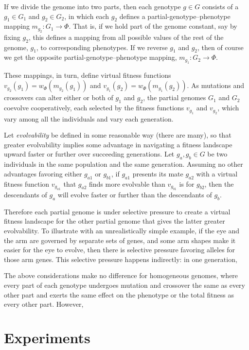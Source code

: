 \documentclass[letterpaper]{article}
\begin{document}
If we divide the genome into two parts, then each genotype $g \in G$ consists
of a $g_1 \in G_1$ and $g_2 \in G_2$, in which each $g_2$ defines a
partial-genotype--phenotype mapping $m_{g_2} : G_1 \rightarrow \Phi$. That is,
if we hold part of the genome constant, say by fixing $g_2$, this defines a
mapping from all possible values of the rest of the genome, $g_1$, to
corresponding phenotypes. If we reverse $g_1$ and $g_2$, then of course we get
the opposite partial-genotype--phenotype mapping, $m_{g_1} : G_2 \rightarrow
\Phi$.

These mappings, in turn, define virtual fitness functions $v_{g_2}(g_1) =
w_\Phi(m_{g_2}(g_1))$ and $v_{g_1}(g_2) = w_\Phi(m_{g_1}(g_2))$. As mutations
and crossovers can alter either or both of $g_1$ and $g_2$, the partial
genomes $G_1$ and $G_2$ coevolve cooperatively, each selected by
the fitness functions $v_{g_1}$ and $v_{g_2}$, which vary among all the
individuals and vary each generation.

Let \textit{evolvability} be defined in some reasonable way (there are many),
so that greater evolvability implies some advantage in navigating a fitness
landscape upward faster or further over succeeding generations. Let $g_a,g_b
\in G$ be two individuals in the same population and the same generation.
Assuming no other advantages favoring either $g_{a1}$ or $g_{b1}$, if $g_{a1}$
presents its mate $g_{a2}$ with a virtual fitness function $v_{g_{a1}}$ that
$g_{a2}$ finds more evolvable than $v_{g_{b1}}$ is for $g_{b2}$, then the
descendants of $g_a$ will evolve faster or further than the descendants of
$g_b$.

Therefore each partial genome is under selective pressure to create a virtual
fitness landscape for the other partial genome that gives the latter greater
evolvability. To illustrate with an unrealistically simple example, if the eye
and the arm are governed by separate sets of genes, and some arm shapes make
it easier for the eye to evolve, then there is selective pressure favoring
alleles for those arm genes. This selective pressure happens indirectly: in
one generation, 

The above considerations make no difference for homogeneous genomes, where
every part of each genotype undergoes mutation and crossover the same as every
other part and exerts the same effect on the phenotype or the total fitness as
every other part. However, 

\section{Experiments}
\end{document}
